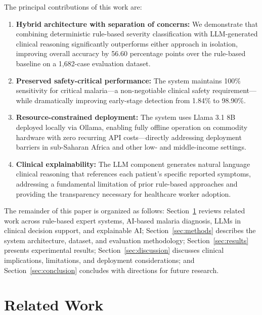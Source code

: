 \documentclass[12pt,a4paper]{article}
\begin{document}
The principal contributions of this work are:

\begin{enumerate}
  \item \textbf{Hybrid architecture with separation of concerns:} We demonstrate that combining deterministic rule-based severity classification with LLM-generated clinical reasoning significantly outperforms either approach in isolation, improving overall accuracy by 56.60 percentage points over the rule-based baseline on a 1,682-case evaluation dataset.

  \item \textbf{Preserved safety-critical performance:} The system maintains 100\% sensitivity for critical malaria---a non-negotiable clinical safety requirement---while dramatically improving early-stage detection from 1.84\% to 98.90\%.

  \item \textbf{Resource-constrained deployment:} The system uses Llama 3.1 8B deployed locally via Ollama, enabling fully offline operation on commodity hardware with zero recurring API costs---directly addressing deployment barriers in sub-Saharan Africa and other low- and middle-income settings.

  \item \textbf{Clinical explainability:} The LLM component generates natural language clinical reasoning that references each patient's specific reported symptoms, addressing a fundamental limitation of prior rule-based approaches and providing the transparency necessary for healthcare worker adoption.
\end{enumerate}

The remainder of this paper is organized as follows: Section~\ref{sec:related} reviews related work across rule-based expert systems, AI-based malaria diagnosis, LLMs in clinical decision support, and explainable AI; Section~\ref{sec:methods} describes the system architecture, dataset, and evaluation methodology; Section~\ref{sec:results} presents experimental results; Section~\ref{sec:discussion} discusses clinical implications, limitations, and deployment considerations; and Section~\ref{sec:conclusion} concludes with directions for future research.

\section{Related Work}
\label{sec:related}
\end{document}
